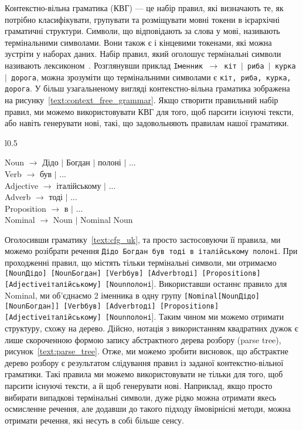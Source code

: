 Контекстно-вільна граматика (КВГ) --- це набір правил, які визначають те, як потрібно класифікувати,
групувати та розміщувати мовні токени в ієрархічні граматичні структури. Символи, що
відповідають за слова у мові, називають термінальними символами. Вони також є і кінцевими
токенами, які можна зустріти у наборах даних. Набір правил, який оголошує термінальні
символи називають лексиконом~\cite{bib5}. Розглянувши приклад
\texttt{Іменник~$\rightarrow$~кіт~$\mid$~риба~$\mid$~курка~$\mid$~дорога}, можна зрозуміти
що термінальними символами є \texttt{кіт, риба, курка, дорога}. У більш узагальненому
вигляді контекстно-вільна граматика зображена на рисунку~\ref{text:context_free_grammar}.
Якщо створити правильний набір правил, ми можемо використовувати КВГ для того, щоб парсити
існуючі тексти, або навіть генерувати нові, такі, що задовольняють правилам нашої граматики.

\begin{wrapfigure}{l}{0.5\textwidth}
  \begin{flushleft}
    \noindent Noun $\rightarrow$ Дідо $\mid$ Богдан $\mid$ полоні $\mid$ ... \\
    \noindent Verb $\rightarrow$ був $\mid$ ...\\
    \noindent Adjective $\rightarrow$ італійському $\mid$ ... \\
    \noindent Adverb $\rightarrow$ тоді $\mid$ ... \\
    \noindent Proposition $\rightarrow$ в $\mid$ ... \\
    \noindent Nominal $\rightarrow$ Noun $\mid$ Nominal Noun \\
  \end{flushleft}
  \caption{Задана КВГ}
  \label{text:cfg_uk}
\end{wrapfigure}

Оголосивши граматику~\ref{text:cfg_uk}, та просто застосовуючи її правила,
ми можемо розібрати речення \texttt{Дідо Богдан був тоді в італійському полоні}.
При проходженні правил, що містять тільки термінальні символи, ми отримаємо
\texttt{[{\footnotesize Noun}Дідо] [{\footnotesize Noun}Богдан] 
[{\footnotesize Verb}був] [{\footnotesize Adverb}тоді]
[{\footnotesize Proposition}в] [{\footnotesize Adjective}італійському]
[{\footnotesize Noun}полоні}]. Використавши останнє правило для Nominal, ми об'єднаємо
2 іменника в одну групу 
\texttt{[{\footnotesize Nominal}[{\footnotesize Noun}Дідо][{\footnotesize Noun}Богдан]]
[{\footnotesize Verb}був] [{\footnotesize Adverb}тоді] [{\footnotesize Proposition}в]
[{\footnotesize Adjective}італійському] [{\footnotesize Noun}полоні}].
Таким чином ми можемо отримати структуру, схожу на дерево. Дійсно, нотація з використанням
квадратних дужок є лише скороченною формою запису
абстрактного дерева розбору (parse tree), рисунок~\ref{text:parse_tree}.
Отже, ми можемо зробити висновок, що абстрактне дерево розбору є результатом слідування
правил із заданої контекстно-вільної граматики. Такі правила ми можемо використовувати не
тільки для того, щоб парсити існуючі тексти, а й щоб генерувати нові. Наприклад, якщо
просто вибирати випадкові термінальні символи, дуже рідко можна отримати якесь осмисленне
речення, але додавши до такого підходу ймовірнісні методи, можна отримати речення, які
несуть в собі більше сенсу.

